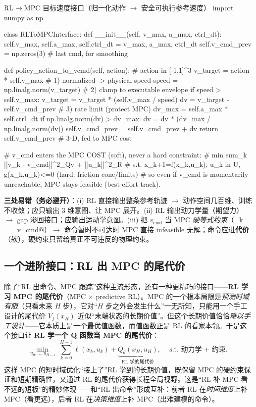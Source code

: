 \begin{codebox}[Python]{RL$\to$MPC 目标速度接口（归一化动作 $\to$ 安全可执行参考速度）}
import numpy as np

class RLToMPCInterface:
    def __init__(self, v_max, a_max, ctrl_dt):
        self.v_max, self.a_max, self.ctrl_dt = v_max, a_max, ctrl_dt
        self.v_cmd_prev = np.zeros(3)              # last cmd, for smoothing

    def policy_action_to_vcmd(self, action):       # action in [-1,1]^3
        v_target = action * self.v_max             # 1) normalized -> physical speed
        speed = np.linalg.norm(v_target)           # 2) clamp to executable envelope
        if speed > self.v_max:
            v_target = v_target * (self.v_max / speed)
        dv = v_target - self.v_cmd_prev            # 3) rate limit (protect MPC)
        dv_max = self.a_max * self.ctrl_dt
        if np.linalg.norm(dv) > dv_max:
            dv = dv * (dv_max / np.linalg.norm(dv))
        self.v_cmd_prev = self.v_cmd_prev + dv
        return self.v_cmd_prev                      # 3-D, fed to MPC cost

# v_cmd enters the MPC COST (soft), never a hard constraint:
#   min  sum_k ||v_k - v_cmd||^2_{Qv} + ||u_k||^2_R
#   s.t. x_{k+1}=f(x_k,u_k),  u_k in U,  g(x_k,u_k)<=0   (hard: friction cone/limits)
# so even if v_cmd is momentarily unreachable, MPC stays feasible (best-effort track).
\end{codebox}

\noindent\textbf{三处易错（务必避开）}：(i) RL 直接输出整条参考轨迹 $\to$ 动作空间几百维、训练不收敛；应只输出 $3$ 维意图、让 MPC 展开。(ii) RL 输出动力学量（期望力）$\to$ gap 渗回接口；应输出运动学意图。(iii) 把 $v_{\text{cmd}}$ 当 MPC \emph{硬等式约束}（\verb@v_k == v_cmd@）$\to$ 命令暂时不可达时 MPC 直接 infeasible 无解；命令应进\textbf{代价}（软），硬约束只留给真正不可违反的物理约束。

\subsection{一个进阶接口：RL 出 MPC 的尾代价}
\label{sec:mh-terminal-cost}

除了“RL 出命令、MPC 跟踪”这种主流形态，还有一种更精巧的接口——\textbf{RL 学习 MPC 的尾代价}（MPC $\times$ predictive RL\cite{bjelonic2023mpcrl}）。MPC 的一个根本局限是\emph{预测时域有限}（只看未来 $H$ 步），它对“$H$ 步之外会发生什么”一无所知，只能用一个手工设计的尾代价 $V_f(x_H)$ 近似“末端状态的长期价值”。但这个长期价值恰恰\emph{难以手工设计}——它本质上是一个最优值函数，而值函数正是 RL 的看家本领。于是这个接口让 \textbf{RL 学一个 Q 函数当 MPC 的尾代价}：
\begin{equation}
  \min_{u_0,\dots,u_{H-1}}\ \sum_{k=0}^{H-1}\ell(x_k,u_k)+\underbrace{Q_\theta(x_H,u_H)}_{\text{RL 学的尾代价}},\quad\text{s.t. 动力学 $+$ 约束.}
  \label{eq:mh-terminal-q}
\end{equation}
这样 MPC 的短时域优化“接上了”RL 学到的长期价值，既保留 MPC 的硬约束保证和短期精确性，又通过 RL 的尾代价获得长程全局视野。这是“RL 补 MPC 看不远的短板”的精妙体现——和“RL 出命令”形成互补：前者 RL 在\emph{时间维度}上补 MPC（看更远），后者 RL 在\emph{决策维度}上补 MPC（出难建模的命令）。

